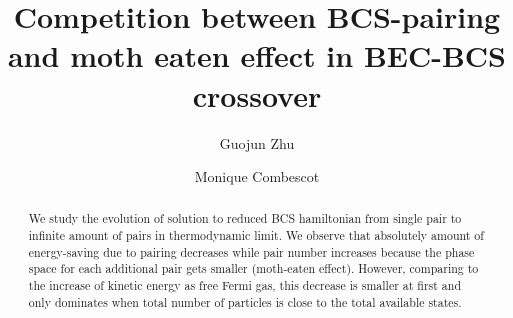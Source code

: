 \documentclass[aps,prb,showpacs,reprint]{revtex4-1}
\begin{document}
\title{Competition between BCS-pairing and moth eaten effect in BEC-BCS crossover}
\author{Guojun Zhu}
\author{Monique Combescot}


\newcommand{\td}{{\ensuremath{{\text{(2D)}}}}}
\newcommand{\sd}{{\ensuremath{{\text{(3D)}}}}}
\newcommand{\Arctg}{\ensuremath{\text{Arctg}}}


\begin{abstract}
We study the evolution of solution to reduced BCS hamiltonian from single pair to infinite amount of pairs in thermodynamic limit.  We observe that absolutely amount of energy-saving due to pairing decreases while pair number increases because the phase space for each additional pair gets smaller (moth-eaten effect).  However, comparing to the increase of kinetic energy as free Fermi gas, this decrease is smaller at first and only dominates  when total number of particles is close to the total available states.  
\end{abstract}
\maketitle
\end{document}
